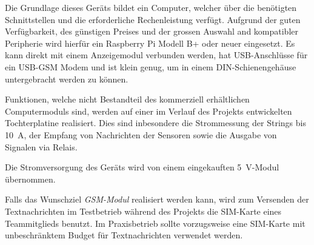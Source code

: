 Die   Grundlage  dieses   Ger\"ats   bildet  ein   Computer,  welcher   \"uber
die   ben\"otigten  Schnittstellen   und   die  erforderliche   Rechenleistung
verf\"ugt. Aufgrund der guten Verf\"ugbarkeit, des g\"unstigen Preises und der
grossen Auswahl  and kompatibler  Peripherie wird  hierf\"ur ein  Raspberry Pi
Modell  B+  oder  neuer  eingesetzt. Es kann  direkt  mit  einem  Anzeigemodul
verbunden werden, hat  USB-Anschl\"usse f\"ur ein USB-GSM Modem  und ist klein
genug, um in einem DIN-Schienengeh\"ause untergebracht werden zu k\"onnen.

Funktionen,   welche   nicht   Bestandteil  des   kommerziell   erh\"altlichen
Computermoduls sind,  werden auf  einer im  Verlauf des  Projekts entwickelten
Tochterplatine realisiert. Dies sind inbesondere  die Strommessung der Strings
bis  \SI{10}{\ampere}, der  Empfang  von Nachrichten  der  Sensoren sowie  die
Ausgabe von Signalen via Relais.

Die    Stromversorgung   des    Ger\"ats   wird    von   einem    eingekauften
\SI{5}{\volt}-Modul \"ubernommen.

Falls  das  Wunschziel  \emph{GSM-Modul}  realisiert  werden  kann,  wird  zum
Versenden  der  Textnachrichten  im  Testbetrieb w\"ahrend  des  Projekts  die
SIM-Karte  eines Teammitglieds  benutzt. Im Praxisbetrieb  sollte vorzugsweise
eine  SIM-Karte mit  unbeschr\"anktem Budget  f\"ur Textnachrichten  verwendet
werden.
